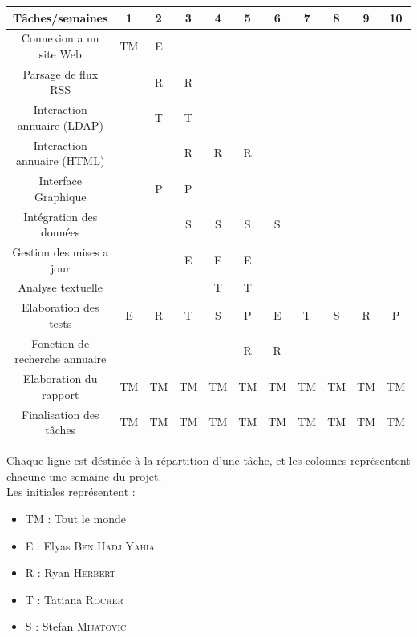 \documentclass [pdftex,12pt] {report}
\begin{document}
\begin{table}[h!]
    \begin{tabular}{|c|c|c|c|c|c|c|c|c|c|c|}
        \hline
        Tâches/semaines                       & 1             & 2       & 3       & 4       & 5       & 6      & 7       & 8      & 9    & 10   \\ \hline
        Connexion a un site Web               & TM & E   & ~       & ~       & ~       & ~      & ~       & ~      & ~    & ~    \\ \hline
        Parsage de flux RSS                   & ~             & R    & R    & ~       & ~       & ~      & ~       & ~      & ~    & ~    \\ \hline
        Interaction annuaire (LDAP)    & ~             & T & T & ~       & ~       & ~      & ~       & ~      & ~    & ~    \\ \hline
        Interaction annuaire (HTML)    & ~             & ~       & R    & R    & R    & ~      & ~       & ~      & ~    & ~    \\ \hline
        Interface Graphique                   & ~             & P    & P    & ~       & ~       & ~      & ~       & ~      & ~    & ~    \\ \hline
        Intégration des données  & ~             & ~       & S  & S  & S  & S & ~       & ~      & ~    & ~    \\ \hline
        Gestion des mises a jour              & ~             & ~       & E   & E   & E   & ~      & ~       & ~      & ~    & ~    \\ \hline
        Analyse textuelle                     & ~             & ~       & ~       & T & T & ~      & ~       & ~      & ~    & ~    \\ \hline
        Elaboration des tests                 & E         & R    & T & S  & P    & E  & T & S & R & P \\ \hline
        Fonction de recherche annuaire & ~             & ~       & ~       & ~       & R    & R   & ~       & ~      & ~    & ~    \\ \hline
        Elaboration du rapport                & TM & TM & TM & TM & TM & TM & TM & TM & TM & TM    \\ \hline
        Finalisation des tâches               & TM & TM & TM & TM & TM & TM & TM & TM & TM & TM    \\
        \hline
    \end{tabular}
\end{table}
Chaque ligne est déstinée à la répartition d'une tâche, et les colonnes représentent chacune une semaine du projet.\\
Les initiales représentent :\\
\begin{itemize}
\item TM : Tout le monde
\item E : Elyas \textsc{Ben Hadj Yahia}
\item R : Ryan \textsc{Herbert}
\item T : Tatiana \textsc{Rocher}
\item S : Stefan \textsc{Mijatovic}
\end{itemize}
\end{document}

